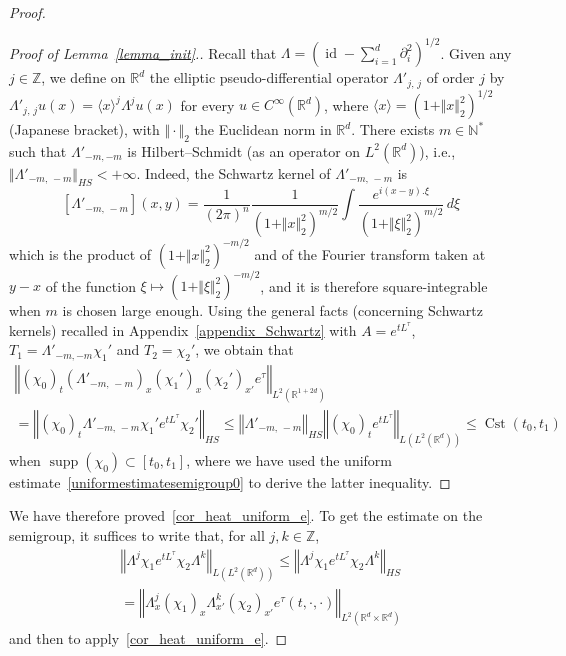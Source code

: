 \documentclass[10pt]{amsart}
\theoremstyle{definition}\newtheorem{defi}[theo]{Definition}\newtheorem{rema}[theo]{Remark}\newtheorem{exam}[theo]{Example}\newtheorem{exem}[theo]{Example}\newtheorem{nota}[theo]{Notation}
\newcommand*\R{\mathbb{R}}
\newcommand*\N{\mathbb{N}}
\newcommand*\Z{\mathbb{Z}}
\DeclareMathOperator{\supp}{supp}
\DeclareMathOperator{\Cst}{Cst}
\DeclareMathOperator{\id}{id}
\renewcommand{\leq}{\leqslant}
\begin{document}
\begin{proof}
\begin{proof}[Proof of Lemma~\ref{lemma_init}.]
Recall that $\Lambda = (\id-\sum_{i=1}^d\partial_i^2)^{1/2}$. Given any $j\in\Z$, we define on $\R^d$ the elliptic pseudo-differential operator $\Lambda'_{j,\,j}$ of order $j$ by $\Lambda'_{j,\,j} u(x) = \langle x\rangle^j \Lambda^j u(x)$ for every $u\in C^\infty(\R^d)$, where $\langle x\rangle = (1+\Vert x\Vert_2^2)^{1/2}$ (Japanese bracket), with $\Vert\cdot\Vert_2$ the Euclidean norm in $\R^d$. There exists $m\in\N^*$ such that $\Lambda'_{-m,-m}$ is Hilbert--Schmidt (as an operator on $L^2(\R^d)$), i.e., $\Vert \Lambda'_{-m,\,-m} \Vert_{HS}<+\infty$. Indeed, the Schwartz kernel of $\Lambda'_{-m,\,-m}$ is
\[
\left[\Lambda'_{-m,\,-m}\right](x,y) = \frac{1}{(2\pi)^n}\frac{1}{(1+\Vert x\Vert_2^2)^{m/2}} \int \frac{e^{i(x-y).\xi}}{(1+\Vert \xi\Vert_2^2)^{m/2}}\, d\xi
\]
which is the product of $(1+\Vert x\Vert_2^2)^{-m/2}$ and of the Fourier transform taken at $y-x$ of the function $\xi\mapsto (1+\Vert \xi\Vert_2^2)^{-m/2}$, and it is therefore square-integrable when $m$ is chosen large enough. Using the general facts (concerning Schwartz kernels) recalled in Appendix~\ref{appendix_Schwartz} with $A = e^{t L^\tau}$, $T_1=\Lambda'_{-m,-m} \chi_1'$ and $T_2 = \chi_2'$, we obtain that
\begin{multline*}
\left\Vert (\chi_0)_t(\Lambda'_{-m,\,-m})_x(\chi_1')_x(\chi_2')_{x'}e^\tau \right\Vert_{L^2\left(\R^{1+2d}\right)} \\= \left\Vert (\chi_0)_t \Lambda'_{-m,\,-m} \chi_1' e^{tL^\tau}\chi_2' \right\Vert_{HS}
\leq \left\Vert \Lambda'_{-m,\,-m} \right\Vert_{HS} \left\Vert (\chi_0)_t e^{t L^\tau}\right\Vert_{L\left(L^2\left(\R^d\right)\right)}
\leq \Cst(t_0,t_1)
\end{multline*}
when $\supp(\chi_0)\subset[t_0,t_1]$, where we have used the uniform estimate~\eqref{uniformestimatesemigroup0} to derive the latter inequality.
\end{proof}

We have therefore proved~\eqref{cor_heat_uniform_e}. To get the estimate on the semigroup, it suffices to write that, for all $j,k\in\Z$,
\begin{multline*}
\left\Vert \Lambda^j \chi_1 e^{tL^\tau}\chi_2\Lambda^k\right\Vert_{L\left(L^2\left(\R^d\right)\right)} \leq \left\Vert \Lambda^j \chi_1 e^{tL^\tau}\chi_2\Lambda^k\right\Vert_{HS}\\
= \left\Vert \Lambda^j_x(\chi_1)_x \Lambda^k_{x'} (\chi_2)_{x'} e^\tau(t,\cdot,\cdot)\right\Vert_{L^2\left(\R^d\times\R^d\right)}
\end{multline*}
and then to apply~\eqref{cor_heat_uniform_e}.
\end{proof}
\end{document}
